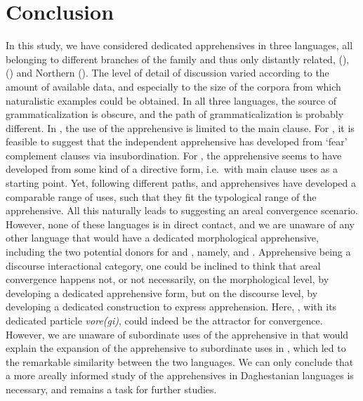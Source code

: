 \documentclass[output=paper,colorlinks,citecolor=brown]{langscibook}
\begin{document}
\section{Conclusion}
\label{daniel:conclusion}
 
In this study, we have considered dedicated apprehensives in three  languages, all belonging to different branches of the family and thus only distantly related,  (),  () and Northern  (). The level of detail of discussion varied according to the amount of available data, and especially to the size of the corpora from which naturalistic examples could be obtained. In all three languages, the source of grammaticalization is obscure, and the path of grammaticalization is probably different. In , the use of the apprehensive is limited to the main clause. For , it is feasible to suggest that the independent apprehensive has developed from `fear' complement clauses via insubordination. For , the apprehensive seems to have developed from some kind of a directive form, i.e.\   with main clause uses as a starting point. Yet, following different paths,  and  apprehensives have developed a comparable range of uses, such that they fit the typological range of the apprehensive. All this naturally leads to suggesting an areal convergence scenario. However, none of these languages is in direct contact, and we are unaware of any other  language that would have a dedicated morphological apprehensive, including the two potential donors for  and , namely,  and . Apprehensive being a discourse interactional category, one could be inclined to think that areal convergence happens not, or not necessarily, on the morphological level, by developing a dedicated apprehensive form, but on the discourse level, by developing a dedicated construction to express apprehension. Here, , with its dedicated particle \textit{vore(gi)}, could indeed be the attractor for convergence. However, we are unaware of subordinate uses of the apprehensive in  that would explain the expansion of the apprehensive to subordinate uses in , which led to the remarkable similarity between the two languages. We can only conclude that a more areally informed study of the apprehensives in Daghestanian languages is necessary, and remains a task for further studies. 
\end{document}
